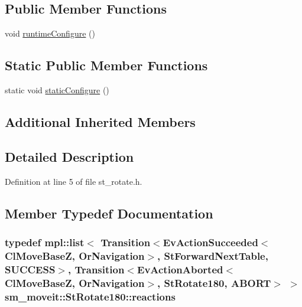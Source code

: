 \subsection*{Public Member Functions}
\begin{DoxyCompactItemize}
\item 
void \hyperlink{structsm__moveit_1_1StRotate180_af424dc219c107d5c3678c6fc915d9c68}{runtime\+Configure} ()
\end{DoxyCompactItemize}
\subsection*{Static Public Member Functions}
\begin{DoxyCompactItemize}
\item 
static void \hyperlink{structsm__moveit_1_1StRotate180_a7ce91eeeb1a8740e1a6f797a41dc940a}{static\+Configure} ()
\end{DoxyCompactItemize}
\subsection*{Additional Inherited Members}


\subsection{Detailed Description}


Definition at line 5 of file st\+\_\+rotate.\+h.



\subsection{Member Typedef Documentation}
\subsubsection[{\texorpdfstring{reactions}{reactions}}]{\setlength{\rightskip}{0pt plus 5cm}typedef mpl\+::list$<$ Transition$<$Ev\+Action\+Succeeded$<${\bf Cl\+Move\+BaseZ}, {\bf Or\+Navigation}$>$, {\bf St\+Forward\+Next\+Table}, {\bf S\+U\+C\+C\+E\+SS}$>$, Transition$<$Ev\+Action\+Aborted$<${\bf Cl\+Move\+BaseZ}, {\bf Or\+Navigation}$>$, {\bf St\+Rotate180}, {\bf A\+B\+O\+RT}$>$ $>$ {\bf sm\+\_\+moveit\+::\+St\+Rotate180\+::reactions}}\hypertarget{structsm__moveit_1_1StRotate180_a1f3d4ae503a581dfffd91742b9c77610}{}\label{structsm__moveit_1_1StRotate180_a1f3d4ae503a581dfffd91742b9c77610}


